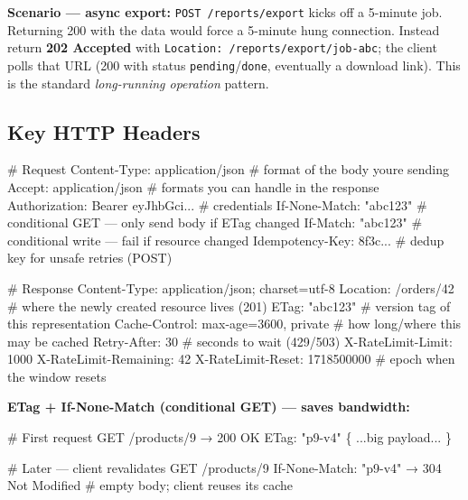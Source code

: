 \documentclass[11pt]{article}
\newenvironment{Shaded}{\begin{snugshade}}{\end{snugshade}}
\newcommand{\NormalTok}[1]{\textcolor[rgb]{0.81,0.81,0.76}{#1}}
\begin{document}
\textbf{Scenario --- async export:} \texttt{POST\ /reports/export} kicks off a 5-minute job. Returning 200 with the data would force a 5-minute hung connection. Instead return \textbf{202 Accepted} with \texttt{Location:\ /reports/export/job-abc}; the client polls that URL (200 with status \texttt{pending}/\texttt{done}, eventually a download link). This is the standard \emph{long-running operation} pattern.

\subsection{Key HTTP Headers}\label{key-http-headers}


\begin{Shaded}
\begin{Highlighting}[]
\NormalTok{\# Request}
\NormalTok{Content{-}Type: application/json          \# format of the body you\textquotesingle{}re sending}
\NormalTok{Accept: application/json                \# formats you can handle in the response}
\NormalTok{Authorization: Bearer eyJhbGci...       \# credentials}
\NormalTok{If{-}None{-}Match: "abc123"                 \# conditional GET — only send body if ETag changed}
\NormalTok{If{-}Match: "abc123"                      \# conditional write — fail if resource changed}
\NormalTok{Idempotency{-}Key: 8f3c...               \# dedup key for unsafe retries (POST)}

\NormalTok{\# Response}
\NormalTok{Content{-}Type: application/json; charset=utf{-}8}
\NormalTok{Location: /orders/42                     \# where the newly created resource lives (201)}
\NormalTok{ETag: "abc123"                          \# version tag of this representation}
\NormalTok{Cache{-}Control: max{-}age=3600, private    \# how long/where this may be cached}
\NormalTok{Retry{-}After: 30                          \# seconds to wait (429/503)}
\NormalTok{X{-}RateLimit{-}Limit: 1000}
\NormalTok{X{-}RateLimit{-}Remaining: 42}
\NormalTok{X{-}RateLimit{-}Reset: 1718500000            \# epoch when the window resets}
\end{Highlighting}
\end{Shaded}

\textbf{ETag + If-None-Match (conditional GET) --- saves bandwidth:}


\begin{Shaded}
\begin{Highlighting}[]
\NormalTok{\# First request}
\NormalTok{GET /products/9}
\NormalTok{→ 200 OK}
\NormalTok{  ETag: "p9{-}v4"}
\NormalTok{  \{ ...big payload... \}}

\NormalTok{\# Later — client revalidates}
\NormalTok{GET /products/9}
\NormalTok{If{-}None{-}Match: "p9{-}v4"}
\NormalTok{→ 304 Not Modified      \# empty body; client reuses its cache}
\end{Highlighting}
\end{Shaded}
\end{document}
